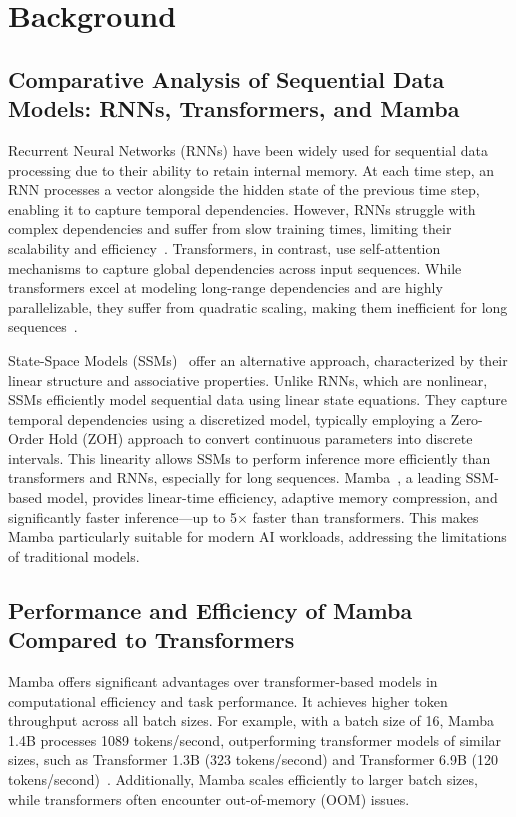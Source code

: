 \section{Background}\label{sec_background}
\subsection{Comparative Analysis of Sequential Data Models: RNNs, Transformers, and Mamba}
Recurrent Neural Networks (RNNs) have been widely used for sequential data processing due to their ability to retain internal memory. At each time step, an RNN processes a vector alongside the hidden state of the previous time step, enabling it to capture temporal dependencies. However, RNNs struggle with complex dependencies and suffer from slow training times, limiting their scalability and efficiency~\cite{rnn_limitations}. Transformers, in contrast, use self-attention mechanisms to capture global dependencies across input sequences. While transformers excel at modeling long-range dependencies and are highly parallelizable, they suffer from quadratic scaling, making them inefficient for long sequences~\cite{transformer_limitations}. 

State-Space Models (SSMs)~\cite{mamba2} offer an alternative approach, characterized by their linear structure and associative properties. Unlike RNNs, which are nonlinear, SSMs efficiently model sequential data using linear state equations. They capture temporal dependencies using a discretized model, typically employing a Zero-Order Hold (ZOH) approach to convert continuous parameters into discrete intervals. This linearity allows SSMs to perform inference more efficiently than transformers and RNNs, especially for long sequences. Mamba~\cite{mamba}, a leading SSM-based model, provides linear-time efficiency, adaptive memory compression, and significantly faster inference—up to 5$\times$ faster than transformers. This makes Mamba particularly suitable for modern AI workloads, addressing the limitations of traditional models.

\subsection{Performance and Efficiency of Mamba Compared to Transformers}
Mamba offers significant advantages over transformer-based models in computational efficiency and task performance. It achieves higher token throughput across all batch sizes. For example, with a batch size of 16, Mamba 1.4B processes 1089 tokens/second, outperforming transformer models of similar sizes, such as Transformer 1.3B (323 tokens/second) and Transformer 6.9B (120 tokens/second)~\cite{mamba_performance}. Additionally, Mamba scales efficiently to larger batch sizes, while transformers often encounter out-of-memory (OOM) issues. 

